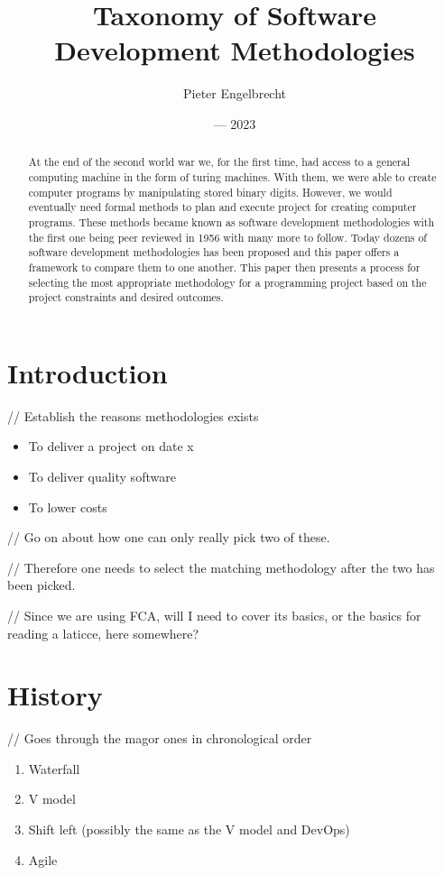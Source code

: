 \documentclass{article}
\title{Taxonomy of Software Development Methodologies}
\author{Pieter Engelbrecht}
\date{--- 2023}
\begin{document}
\maketitle

\begin{abstract}
  At the end of the second world war we, for the first time, had access to a general computing machine in the form of turing machines.
  With them, we were able to create computer programs by manipulating stored binary digits.
  However, we would eventually need formal methods to plan and execute project for creating computer programs.
  These methods became known as software development methodologies with the first one being peer reviewed in 1956 with many more to follow.
  Today dozens of software development methodologies has been proposed and this paper offers a framework to compare them to one another.
  This paper then presents a process for selecting the most appropriate methodology for a programming project based on the project constraints and desired outcomes.
\end{abstract}

\section{Introduction}
// Establish the reasons methodologies exists

\begin{itemize}
    \item To deliver a project on date x
    \item To deliver quality software
    \item To lower costs
\end{itemize}

// Go on about how one can only really pick two of these.

// Therefore one needs to select the matching methodology after the two has been picked.

// Since we are using FCA, will I need to cover its basics, or the basics for reading a laticce, here somewhere?

\section{History}
// Goes through the magor ones in chronological order

\begin{enumerate}
  \item Waterfall
  \item V model
  \item Shift left (possibly the same as the V model and DevOps)
  \item Agile
\end{enumerate}
\end{document}
